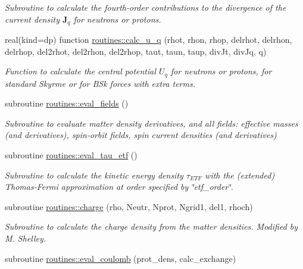 \begin{DoxyCompactItemize}
\begin{DoxyCompactList}\small\item\em Subroutine to calculate the fourth-\/order contributions to the divergence of the current density $\textbf{J}_q$ for neutrons or protons. \end{DoxyCompactList}\item 
real(kind=dp) function \mbox{\hyperlink{namespaceroutines_a2a44c591985c939162dabdeab4a4ced8}{routines\+::calc\+\_\+u\+\_\+q}} (rhot, rhon, rhop, delrhot, delrhon, delrhop, del2rhot, del2rhon, del2rhop, taut, taun, taup, div\+Jt, div\+Jq, q)
\begin{DoxyCompactList}\small\item\em Function to calculate the central potential $U_q$ for neutrons or protons, for standard Skyrme or for B\+Sk forces with extra terms. \end{DoxyCompactList}\item 
subroutine \mbox{\hyperlink{namespaceroutines_aa995449a9eb9c404dbd756bdbea180a2}{routines\+::eval\+\_\+fields}} ()
\begin{DoxyCompactList}\small\item\em Subroutine to evaluate matter density derivatives, and all fields\+: effective masses (and derivatives), spin-\/orbit fields, spin current densities (and derivatives) \end{DoxyCompactList}\item 
subroutine \mbox{\hyperlink{namespaceroutines_a97bfcff7e603cf9df3dcd48ae21b4612}{routines\+::eval\+\_\+tau\+\_\+etf}} ()
\begin{DoxyCompactList}\small\item\em Subroutine to calculate the kinetic energy density $\tau_{ETF}$ with the (extended) Thomas-\/\+Fermi approximation at order specified by \char`\"{}etf\+\_\+order\char`\"{}. \end{DoxyCompactList}\item 
subroutine \mbox{\hyperlink{namespaceroutines_afb83677ec76758dadc35de4b01bac45c}{routines\+::charge}} (rho, Neutr, Nprot, Ngrid1, del1, rhoch)
\begin{DoxyCompactList}\small\item\em Subroutine to calculate the charge density from the matter densities. Modified by M. Shelley. \end{DoxyCompactList}\item 
subroutine \mbox{\hyperlink{namespaceroutines_a74ed186c93b400a14428192e1cb7a0b2}{routines\+::eval\+\_\+coulomb}} (prot\+\_\+dens, calc\+\_\+exchange)

\end{DoxyCompactItemize}
